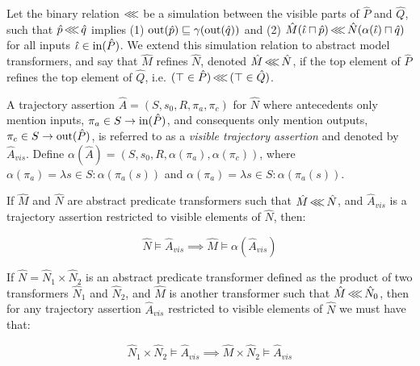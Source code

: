 Let the binary relation $\operatorname{\lll}$ be a simulation between the visible parts of $\hat P$ and $\hat Q$, such that $\hat p \operatorname{\lll} \hat q$ implies (1) $\operatorname{out}(\hat p) \sqsubseteq \gamma(\operatorname{out}(\hat q))$ and (2) $\hat M(\hat \iota \sqcap \hat p) \operatorname{\lll} \hat N(\alpha(\hat \iota) \sqcap \hat q)$ for all inputs $\hat \iota \in \operatorname{in}(\hat P)$. We extend this simulation relation to abstract model transformers, and say that $\hat M$ refines $\hat N$, denoted $\hat M \operatorname{\lll} \hat N$, if the top element of $\hat P$ refines the top element of $\hat Q$, i.e. $(\top \in \hat P) \operatorname{\lll} \, (\top \in \hat Q)$. 


A trajectory assertion $\hat A = (S, s_{0}, R, \pi_{a}, \pi_{c})$ for $\hat N$ where antecedents only mention inputs, $\pi_{a} \in S \rightarrow \operatorname{in}(\hat P)$, and consequents only mention outputs, $\pi_{c} \in S \rightarrow \operatorname{out}(\hat P)$, is referred to as a \textit{visible trajectory assertion} and denoted by $\hat A_{vis}$. Define $\alpha(\hat A) = (S, s_{0}, R, \alpha(\pi_{a}), \alpha(\pi_{c}))$, where $\alpha(\pi_{a}) = \lambda s \in S : \alpha(\pi_{a}(s))$ and $\alpha(\pi_{a}) = \lambda s \in S : \alpha(\pi_{a}(s))$.



\begin{theorem}
\label{thm:refinement}
If $\hat M$ and $\hat N$ are abstract predicate transformers such that $\hat M \operatorname{\lll} \hat N$, and $\hat A_{vis}$ is a trajectory assertion restricted to visible elements of $\hat N$, then:

\begin{equation*}
\hat N \models \hat A_{vis} \implies \hat M \models \alpha(\hat A_{vis})
\end{equation*}
\end{theorem}

\begin{corollary}
\label{thm:refinement-product}
If $\hat N = \hat N_{1} \times \hat N_{2}$ is an abstract predicate transformer defined as the product of two transformers $\hat N_{1}$ and $\hat N_{2}$, and $\hat M$ is another transformer such that $\hat M \operatorname{\lll} \hat N_{0}$, then for any trajectory assertion $\hat A_{vis}$ restricted to visible elements of $\hat N$ we must have that:

\begin{equation*}
\hat N_{1} \times \hat N_{2} \models \hat A_{vis} \implies \hat M \times \hat N_{2} \models \hat A_{vis}
\end{equation*}
\end{corollary}

